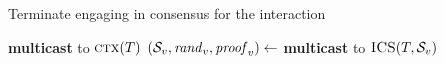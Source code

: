 \begin{breakablealgorithm}
\begin{algorithmic}[1]
    \State Terminate engaging in consensus for the interaction
\EndFor
\item[]

        \State \textbf{multicast}  to $\mathrm{\textsc{ctx}}(T)$   
    \Else
        \State $(\mathcal{S}_v, \mathit{rand}_v, \mathit{proof}_v) \gets$ 
        \State \textbf{multicast}  to $\mathrm{\textsc{ICS}}(T, \mathcal{S}_v)$   
    \EndIf
\EndProcedure
\item[] 



\end{algorithmic}
\end{breakablealgorithm}